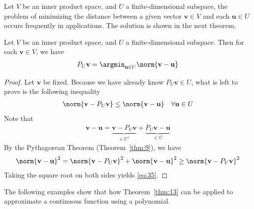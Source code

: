 \documentclass[thmcnt=section, color=blue, 12pt]{my-elegantbook}
\begin{document}

Let $V$ be an inner product space, and $U$ a finite-dimensional subspace,
the problem of minimizing the distance between a 
given vector $\mathbf{v} \in V$ and each $\mathbf{u} \in U$
occurs frequently in applications.
The solution is shown in the next theorem.

\begin{theorem} \label{thm:13}
	Let $V$ be an inner product space,
	and $U$ a finite-dimensional subspace.
	Then for each $\mathbf{v} \in V$, we have 
	\begin{align*}
		P_U \mathbf{v}
		= \argmin_{\mathbf{u} \in U} \norm{\mathbf{v} - \mathbf{u}}
	\end{align*}
\end{theorem}

\begin{proof}
	Let $\mathbf{v}$ be fixed.
	Because we have already know $P_U \mathbf{v} \in U$, 
	what is left to prove is the following inequality
	\begin{align}
		\norm{\mathbf{v} - P_U \mathbf{v}}
		\leq \norm{\mathbf{v} - \mathbf{u}}
		\quad
		\forall \mathbf{u} \in U
		\label{eq:35}
	\end{align}
	Note that 
	\begin{align*}
		\mathbf{v} - \mathbf{u}
		= \underbrace{\mathbf{v} - P_U \mathbf{v}}_{\in U^\perp}
		+ \underbrace{P_U \mathbf{v} - \mathbf{u}}_{\in U}
	\end{align*}
	By the Pythagorean Theorem (Theorem~\ref{thm:9}),
	we have 
	\begin{align*}
		\norm{\mathbf{v} - \mathbf{u}}^2 
		= \norm{\mathbf{v} - P_U \mathbf{v}}^2 
		+ \norm{\mathbf{v} - \mathbf{u}}^2
		\geq \norm{\mathbf{v} - P_U \mathbf{v}}^2
	\end{align*}
	Taking the square root on both sides yields \eqref{eq:35}.
\end{proof}


The following examples show that
how Theorem~\ref{thm:13} can be applied to
approximate a continuous function
using a polynomial.
\end{document}
